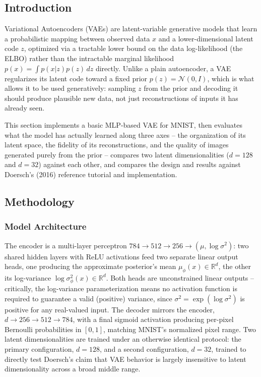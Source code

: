 \subsection{Introduction}

Variational Autoencoders (VAEs) are latent-variable generative models that
learn a probabilistic mapping between observed data $x$ and a lower-dimensional
latent code $z$, optimized via a tractable lower bound on the data
log-likelihood (the ELBO) rather than the intractable marginal likelihood
$p(x)=\int p(x|z)p(z)\,dz$ directly. Unlike a plain autoencoder, a VAE
regularizes its latent code toward a fixed prior $p(z)=\mathcal{N}(0,I)$,
which is what allows it to be used generatively: sampling $z$ from the prior
and decoding it should produce plausible new data, not just reconstructions
of inputs it has already seen.

This section implements a basic MLP-based VAE for MNIST, then evaluates what
the model has actually learned along three axes -- the organization of its
latent space, the fidelity of its reconstructions, and the quality of images
generated purely from the prior -- compares two latent dimensionalities
($d=128$ and $d=32$) against each other, and compares the design and results
against Doersch's (2016) reference tutorial and implementation.

\subsection{Methodology}

\subsubsection{Model Architecture}

The encoder is a multi-layer perceptron $784 \to 512 \to 256 \to (\mu,\log\sigma^2)$:
two shared hidden layers with ReLU activations feed two separate linear
output heads, one producing the approximate posterior's mean
$\mu_\phi(x) \in \mathbb{R}^{d}$, the other its log-variance
$\log\sigma^2_\phi(x) \in \mathbb{R}^{d}$. Both heads are unconstrained
linear outputs -- critically, the log-variance parameterization means no
activation function is required to guarantee a valid (positive) variance,
since $\sigma^2 = \exp(\log\sigma^2)$ is positive for any real-valued input.
The decoder mirrors the encoder, $d \to 256 \to 512 \to 784$, with a final
sigmoid activation producing per-pixel Bernoulli probabilities in $[0,1]$,
matching MNIST's normalized pixel range. Two latent dimensionalities are
trained under an otherwise identical protocol: the primary configuration,
$d=128$, and a second configuration, $d=32$, trained to directly test
Doersch's claim that VAE behavior is largely insensitive to latent
dimensionality across a broad middle range.

